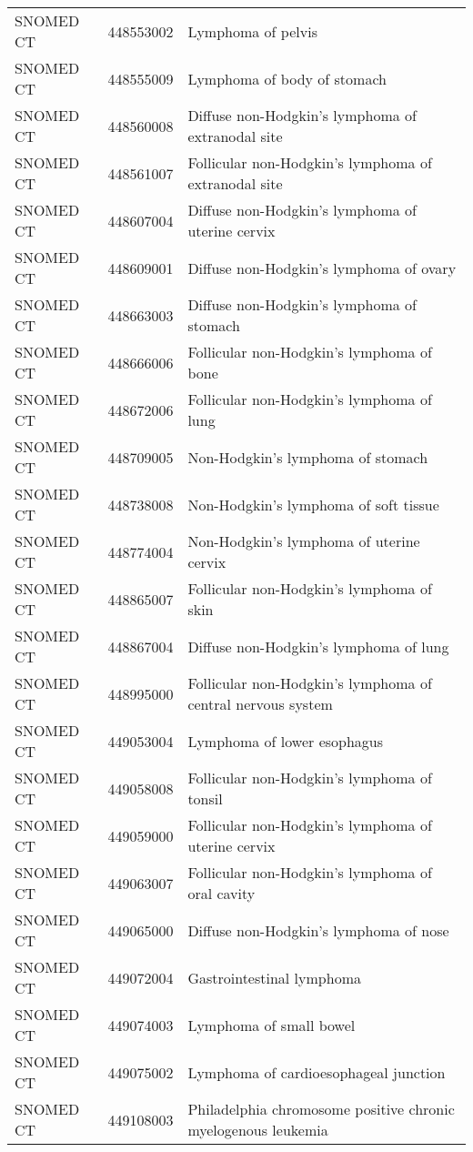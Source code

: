 \begin{longtable}{p{}p{}p{}}
  SNOMED CT & 448553002 & Lymphoma of pelvis \\ 
  SNOMED CT & 448555009 & Lymphoma of body of stomach \\ 
  SNOMED CT & 448560008 & Diffuse non-Hodgkin's lymphoma of extranodal site \\ 
  SNOMED CT & 448561007 & Follicular non-Hodgkin's lymphoma of extranodal site \\ 
  SNOMED CT & 448607004 & Diffuse non-Hodgkin's lymphoma of uterine cervix \\ 
  SNOMED CT & 448609001 & Diffuse non-Hodgkin's lymphoma of ovary \\ 
  SNOMED CT & 448663003 & Diffuse non-Hodgkin's lymphoma of stomach \\ 
  SNOMED CT & 448666006 & Follicular non-Hodgkin's lymphoma of bone \\ 
  SNOMED CT & 448672006 & Follicular non-Hodgkin's lymphoma of lung \\ 
  SNOMED CT & 448709005 & Non-Hodgkin's lymphoma of stomach \\ 
  SNOMED CT & 448738008 & Non-Hodgkin's lymphoma of soft tissue \\ 
  SNOMED CT & 448774004 & Non-Hodgkin's lymphoma of uterine cervix \\ 
  SNOMED CT & 448865007 & Follicular non-Hodgkin's lymphoma of skin \\ 
  SNOMED CT & 448867004 & Diffuse non-Hodgkin's lymphoma of lung \\ 
  SNOMED CT & 448995000 & Follicular non-Hodgkin's lymphoma of central nervous system \\ 
  SNOMED CT & 449053004 & Lymphoma of lower esophagus \\ 
  SNOMED CT & 449058008 & Follicular non-Hodgkin's lymphoma of tonsil \\ 
  SNOMED CT & 449059000 & Follicular non-Hodgkin's lymphoma of uterine cervix \\ 
  SNOMED CT & 449063007 & Follicular non-Hodgkin's lymphoma of oral cavity \\ 
  SNOMED CT & 449065000 & Diffuse non-Hodgkin's lymphoma of nose \\ 
  SNOMED CT & 449072004 & Gastrointestinal lymphoma \\ 
  SNOMED CT & 449074003 & Lymphoma of small bowel \\ 
  SNOMED CT & 449075002 & Lymphoma of cardioesophageal junction \\ 
  SNOMED CT & 449108003 & Philadelphia chromosome positive chronic myelogenous leukemia \\ 

\end{longtable}
